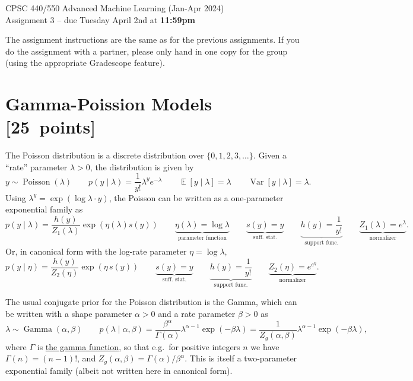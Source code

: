 \documentclass{article}
\newcommand{\pts}[1]{\textcolor{points}{[#1~points]}}
\DeclareMathOperator*{\E}{\mathbb{E}}
\DeclareMathOperator*{\Var}{Var}
\DeclareMathOperator{\Poisson}{Poisson}
\begin{document}
\begin{center}
\Large
CPSC 440/550 Advanced Machine Learning (Jan-Apr 2024)\\
Assignment 3 --
due Tuesday April 2nd at \textbf{11:59pm}
\end{center}


The assignment instructions are the same as for the previous assignments. If you do the assignment with a partner, please only hand in one copy for the group (using the appropriate Gradescope feature).



\section{Gamma-Poission Models \pts{25}}


The Poisson distribution is a discrete distribution over $\{0, 1, 2, 3, \dots \}$.
Given a ``rate'' parameter $\lambda > 0$, the distribution is given by
\[
y \sim \Poisson(\lambda)
    \qquad
p(y \mid \lambda) = \frac{1}{y!} \lambda^y e^{-\lambda}
    \qquad
\E[y \mid \lambda] = \lambda
    \qquad
\Var[y \mid \lambda] = \lambda
.\]
Using $\lambda^y = \exp(\log \lambda \cdot y)$,
the Poisson can be written as a one-parameter exponential family as
\[
p(y \mid \lambda)
= \frac{h(y)}{Z_1(\lambda)} \exp(\eta(\lambda) s(y))
    \qquad
\underbrace{\eta(\lambda) = \log \lambda}_\text{parameter function}
    \qquad
\underbrace{s(y) = y}_\text{suff.\ stat.}
    \qquad
\underbrace{h(y) = \frac{1}{y!}}_\text{support func.}
    \qquad
\underbrace{Z_1(\lambda) = e^\lambda}_\text{normalizer}
.\]
Or, in canonical form with the log-rate parameter $\eta = \log \lambda$,
\[
p(y \mid \eta)
= \frac{h(y)}{Z_2(\eta)} \exp(\eta \, s(y))
    \qquad
\underbrace{s(y) = y}_\text{suff.\ stat.}
    \qquad
\underbrace{h(y) = \frac{1}{y!}}_\text{support func.}
    \qquad
\underbrace{Z_2(\eta) = e^{e^\eta}}_\text{normalizer}
.\]


The usual conjugate prior for the Poisson distribution is the Gamma,
which can be written
with a shape parameter $\alpha > 0$ and a rate parameter $\beta > 0$ as
\[
\lambda \sim \operatorname{Gamma}(\alpha, \beta)
\qquad
p(\lambda \mid \alpha, \beta)
  = \frac{\beta^\alpha}{\Gamma(\alpha)} \lambda^{\alpha-1}\exp(-\beta\lambda)
  = \frac{1}{Z_g(\alpha, \beta)} \lambda^{\alpha-1}\exp(-\beta\lambda)
,\]
where $\Gamma$ is \href{https://en.wikipedia.org/wiki/Gamma_function}{the gamma function}, so that e.g.\ for positive integers $n$ we have $\Gamma(n) = (n - 1)!$,
and $Z_g(\alpha, \beta) = \Gamma(\alpha) / \beta^\alpha$.
This is itself a two-parameter exponential family (albeit not written here in canonical form).
\end{document}

